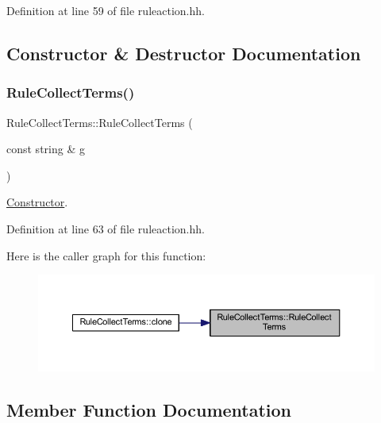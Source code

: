 Definition at line 59 of file ruleaction.\+hh.



\subsection{Constructor \& Destructor Documentation}
\mbox{\label{class_rule_collect_terms_a5fcf4c78908f57d388f3f69c8319030a}} 
\subsubsection{\texorpdfstring{RuleCollectTerms()}{RuleCollectTerms()}}
{\footnotesize\ttfamily Rule\+Collect\+Terms\+::\+Rule\+Collect\+Terms (\begin{DoxyParamCaption}\item[{const string \&}]{g }\end{DoxyParamCaption})\hspace{0.3cm}{\ttfamily [inline]}}



\mbox{\hyperlink{class_constructor}{Constructor}}. 



Definition at line 63 of file ruleaction.\+hh.

Here is the caller graph for this function\+:
\nopagebreak
\begin{figure}[H]
\begin{center}
\leavevmode
\includegraphics[width=350pt]{class_rule_collect_terms_a5fcf4c78908f57d388f3f69c8319030a_icgraph}
\end{center}
\end{figure}


\subsection{Member Function Documentation}
\mbox{\label{class_rule_collect_terms_aae26ebf9404cb382f3b373dccbc64c69}} 

